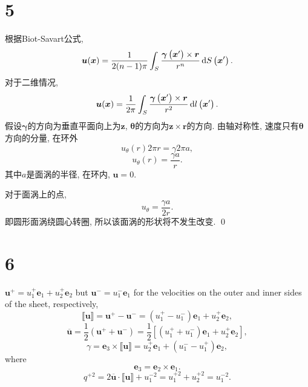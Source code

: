 \documentclass[12pt]{article}
\begin{document}
\section{5}

根据Biot-Savart公式, 
\begin{equation}
	\boldsymbol{u}(\boldsymbol{x})=\frac{1}{2(n-1) \pi} \int_{S} \frac{\bm{\gamma}\left(\boldsymbol{x}^{\prime}\right) \times \boldsymbol{r}}{r^{n}} \dif S\left(\boldsymbol{x}^{\prime}\right).
\end{equation}
对于二维情况, 
\begin{equation}
	\boldsymbol{u}(\boldsymbol{x})=\frac{1}{2 \pi} \int_{S} \frac{\bm{\gamma}\left(\boldsymbol{x}^{\prime}\right) \times \boldsymbol{r}}{r^{2}} \dif l\left(\boldsymbol{x}^{\prime}\right).
\end{equation}
假设$\bm{\gamma}$的方向为垂直平面向上为$\bm{z}$, $\bm{\theta}$的方向为$\bm{z}\times \bm{r}$的方向. 由轴对称性, 速度只有$\bm{\theta}$方向的分量, 在环外
\begin{equation}
	u_\theta(r) 2 \pi r = \gamma 2 \pi a,
\end{equation}
\begin{equation}
	u_\theta(r) = \frac{\gamma a}{r}.
\end{equation}
其中$a$是面涡的半径, 在环内, $\bm{u}=0$.

对于面涡上的点, 
\begin{equation}
	u_\theta = \frac{\gamma a}{2r}.
\end{equation}
即圆形面涡绕圆心转圈, 所以该面涡的形状将不发生改变. \qed

\section{6}

$\bm{u}^+ = u^+_1 \bm{e}_1 + u^+_2 \bm{e}_2$ but $\bm{u}^− = u^−_1 \bm{e}_1$ for the velocities on the outer and inner sides of the sheet, respectively,
\begin{equation}
	\llbracket \boldsymbol{u} \rrbracket = \bm{u}^+ - \bm{u}^- = \left(u_{1}^{+}-u_{1}^{-}\right) \boldsymbol{e}_{1}+u_{2}^{+} \boldsymbol{e}_{2},
\end{equation}
\begin{equation}
	\overline{\boldsymbol{u}} = \frac{1}{2} \left(\bm{u}^+ + \bm{u}^-\right) = \frac{1}{2}\left[\left(u_{1}^{+}+u_{1}^{-}\right) \boldsymbol{e}_{1}+u_{2}^{+} \boldsymbol{e}_{2}\right],
\end{equation}
\begin{equation}
	\gamma = \bm{e}_3 \times \llbracket \boldsymbol{u} \rrbracket = u_{2}^{+} \boldsymbol{e}_{1}+\left(u_{1}^{-}-u_{1}^{+}\right) \boldsymbol{e}_{2},
\end{equation}
where
\begin{equation}
	\bm{e}_3 = \bm{e}_2 \times \bm{e}_1.
\end{equation}
\begin{equation}
	q^{+2} = 2 \overline{\boldsymbol{u}} \cdot \llbracket \boldsymbol{u} \rrbracket + u_{1}^{-2} = u_{1}^{+2}+u_{2}^{+2}=u_{1}^{-2}.
\end{equation}
\end{document}

